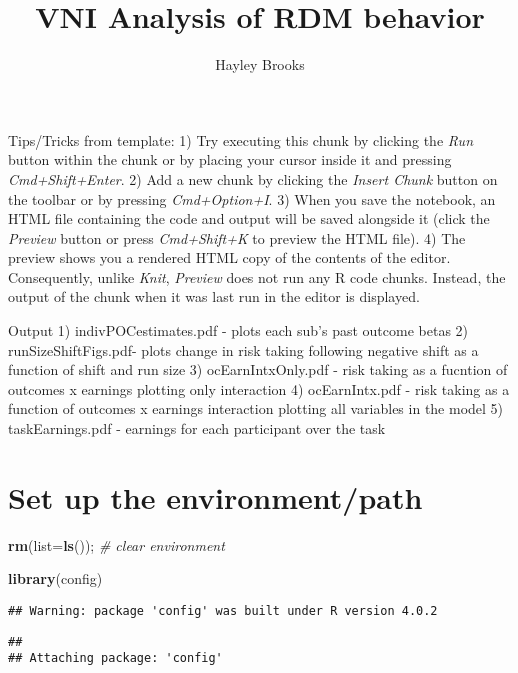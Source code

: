 \documentclass[]{article}
\title{VNI Analysis of RDM behavior}
\author{Hayley Brooks}
\date{}
\newenvironment{Shaded}{\begin{snugshade}}{\end{snugshade}}
\newcommand{\CommentTok}[1]{\textcolor[rgb]{0.56,0.35,0.01}{\textit{#1}}}
\newcommand{\DataTypeTok}[1]{\textcolor[rgb]{0.13,0.29,0.53}{#1}}
\newcommand{\KeywordTok}[1]{\textcolor[rgb]{0.13,0.29,0.53}{\textbf{#1}}}
\newcommand{\NormalTok}[1]{#1}
\begin{document}
\maketitle

Tips/Tricks from template: 1) Try executing this chunk by clicking the
\emph{Run} button within the chunk or by placing your cursor inside it
and pressing \emph{Cmd+Shift+Enter}. 2) Add a new chunk by clicking the
\emph{Insert Chunk} button on the toolbar or by pressing
\emph{Cmd+Option+I}. 3) When you save the notebook, an HTML file
containing the code and output will be saved alongside it (click the
\emph{Preview} button or press \emph{Cmd+Shift+K} to preview the HTML
file). 4) The preview shows you a rendered HTML copy of the contents of
the editor. Consequently, unlike \emph{Knit}, \emph{Preview} does not
run any R code chunks. Instead, the output of the chunk when it was last
run in the editor is displayed.

Output 1) indivPOCestimates.pdf - plots each sub's past outcome betas 2)
runSizeShiftFigs.pdf- plots change in risk taking following negative
shift as a function of shift and run size 3) ocEarnIntxOnly.pdf - risk
taking as a fucntion of outcomes x earnings plotting only interaction 4)
ocEarnIntx.pdf - risk taking as a function of outcomes x earnings
interaction plotting all variables in the model 5) taskEarnings.pdf -
earnings for each participant over the task

\hypertarget{set-up-the-environmentpath}{%
\section{Set up the environment/path}\label{set-up-the-environmentpath}}

\begin{Shaded}
\begin{Highlighting}[]
\KeywordTok{rm}\NormalTok{(}\DataTypeTok{list=}\KeywordTok{ls}\NormalTok{());  }\CommentTok{# clear environment}


\KeywordTok{library}\NormalTok{(config)}
\end{Highlighting}
\end{Shaded}

\begin{verbatim}
## Warning: package 'config' was built under R version 4.0.2
\end{verbatim}

\begin{verbatim}
## 
## Attaching package: 'config'
\end{verbatim}
\end{document}
